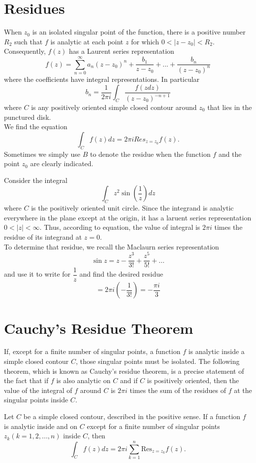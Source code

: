 \section{Residues}
When $ z_0 $ is an isolated singular point of the function, there is a positive number $ R_2 $ such that $ f $ is analytic at each point $ z $ for which $ 0 < |z-z_0| < R_2 $. Consequently, $ f(z) $ has a Laurent series representation 
\[ f(z) = \sum\limits^{\infty}_{n=0} a_n (z-z_0)^n + \dfrac{b_1}{z - z_0} + ... + \dfrac{b_n}{(z-z_0)^n}\] where the coefficients have integral representations. In particular 
\[ b_n = \dfrac{1}{2 \pi i} \int_C \dfrac{f(z dz)}{(z-z_0)^{-n + 1}}\] where $ C $ is any positively oriented simple closed contour around $ z_0 $ that lies in the punctured disk. \\ We find the equation \[ \int_C f(z) dz = 2 \pi i Res_{z=z_0} f(z). \] Sometimes we simply use $ B $ to denote the residue when the function $ f $ and the point $ z_0 $ are clearly indicated.
\begin{example}
	Consider the integral 
	\[ \int_C z^2 \sin \left(\dfrac{1}{z}\right) dz \] where $ C $ is the positively oriented unit circle. Since the integrand is analytic everywhere in the plane except at the origin, it has a laruent series representation $ 0 < |z| < \infty $. Thus, according to equation, the value of integral is $ 2 \pi i $ times the residue of its integrand at $ z = 0 $. \\ To determine that residue, we recall the Maclaurn series representation 
	\[ \sin z = z - \dfrac{z^3}{3!} + \dfrac{z^5}{5!}+... \] and use it to write for $ \dfrac{1}{z} $ and find the desired residue \[ = 2 \pi i \left(-\dfrac{1}{3!}\right) = -\dfrac{ \pi i}{3} \]
\end{example}
\section{Cauchy's Residue Theorem}
If, except for a finite number of singular points, a function $ f $ is analytic inside a simple closed contour $ C $, those singular points must be isolated. The following theorem, which is known as Cauchy's residue theorem, is a precise statement of the fact that if $ f $ is also analytic on $ C $ and if $ C $ is positively oriented, then the value of the integral of $ f $ around $ C $ is $ 2\pi i $ times the sum of the residues of $ f $ at the singular points inside $ C $.
\begin{theorem}
	Let $ C $ be a simple closed contour, described in the positive sense. If a function $ f $ is analytic inside and on $ C $ except for a finite number of singular points $ z_k (k = 1,2,...,n) $ inside $ C $, then 
	\[ \int_C  f(z) dz = 2 \pi i \sum \limits_{k=1}^{n} \text{Res}_{z = z_k} f(z). \] 
\end{theorem}
